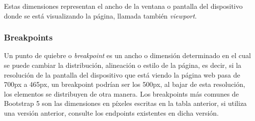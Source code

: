 Estas dimensiones representan el ancho de la ventana o pantalla del dispositivo donde se está visualizando la página, llamada también \textit{viewport}.


\subsubsection{Breakpoints}

Un punto de quiebre o \textit{breakpoint} es un ancho o dimensión determinado en el cual se puede cambiar la distribución, alineación o estilo de la página, es decir, si la resolución de la pantalla del dispositivo que está viendo la página web pasa de 700px a 465px, un breakpoint podrían ser los 500px, al bajar de esta resolución, los elementos se distribuyen de otra manera. Los breakpoints más comunes de Bootstrap 5 son las dimensiones en píxeles escritas en la tabla anterior, si utiliza una versión anterior, consulte los endpoints existentes en dicha versión.

